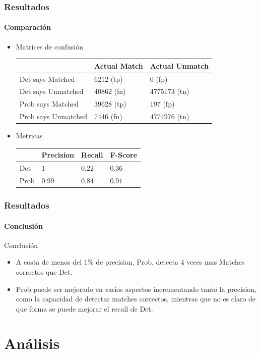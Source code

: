 \documentclass{beamer}
\begin{document}
\begin{frame}
	\frametitle{Resultados}
	\framesubtitle{Comparación}	
\begin{itemize}
\item Matrices de confusión \\
\smallskip
\small
\begin{tabular}{ l | l |  l }                     
   & Actual Match & Actual Unmatch \\ \hline
Det says Matched & $6212$ (tp) & $0$ (fp)\\ \hline
Det says Unmatched & $40862$ (fn) & $4775173$ (tn)\\
  \hline  
Prob says Matched & 39628 (tp) & $197$ (fp)\\ \hline
Prob says Unmatched & 7446 (fn) & $4774976$ (tn)\\
  \hline  
\end{tabular}
\smallskip
\item Metricas \\
\smallskip
\begin{tabular}{ l | l | l |  l }                     
   & Precision & Recall & F-Score\\ \hline
Det & $1$  & $0.22$ & $0.36$ \\ \hline
Prob & $0.99$ & $0.84$ & $0.91$ \\   \hline  
\end{tabular}
\end{itemize}
\end{frame}


\begin{frame}
	\frametitle{Resultados}
	\framesubtitle{Conclusión}	
	\begin{block}{Conclusión}
		\begin{itemize}
		\item A costa de menos del $1\%$ de precision, Prob, detecta 4 veces mas Matches correctos que Det.
		\item Prob puede ser mejorado en varios aspectos incrementando tanto la precision, como la capacidad de detectar matches correctos, mientras que no es claro de que forma se puede mejorar el recall de Det.
		\end{itemize}
  \end{block}
\end{frame}



\section{Análisis}
\end{document}
